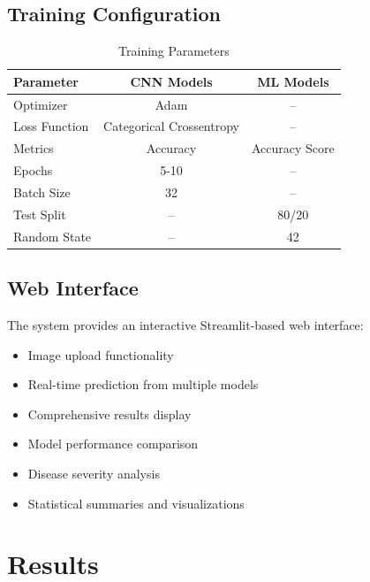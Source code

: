 \documentclass[11pt,a4paper]{article}
\begin{document}
\subsection{Training Configuration}
\begin{table}[h]
\centering
\caption{Training Parameters}
\begin{tabular}{lcc}
\toprule
\textbf{Parameter} & \textbf{CNN Models} & \textbf{ML Models} \\
\midrule
Optimizer & Adam & -- \\
Loss Function & Categorical Crossentropy & -- \\
Metrics & Accuracy & Accuracy Score \\
Epochs & 5-10 & -- \\
Batch Size & 32 & -- \\
Test Split & -- & 80/20 \\
Random State & -- & 42 \\
\bottomrule
\end{tabular}
\end{table}

\subsection{Web Interface}
The system provides an interactive Streamlit-based web interface:
\begin{itemize}
    \item Image upload functionality
    \item Real-time prediction from multiple models
    \item Comprehensive results display
    \item Model performance comparison
    \item Disease severity analysis
    \item Statistical summaries and visualizations
\end{itemize}

\section{Results}
\end{document}
